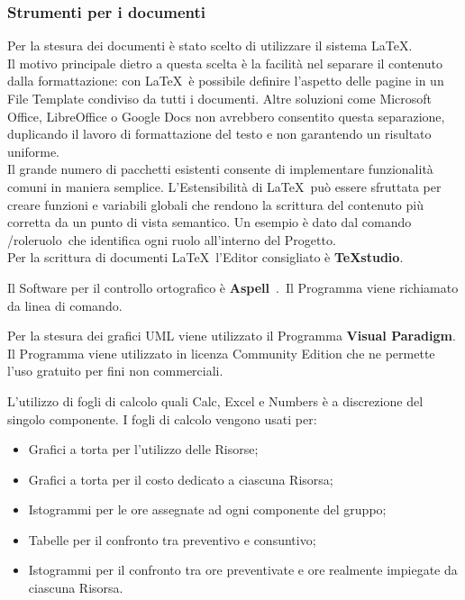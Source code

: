 {  \subsubsection{Strumenti per i documenti}
  \label{sec:strumentiDocumenti}
   
  Per la stesura dei documenti è stato scelto di utilizzare il sistema \LaTeX.\\
  Il motivo principale dietro a questa scelta è la facilità nel separare il contenuto dalla formattazione: 
  con \LaTeX\ è possibile definire l’aspetto delle pagine in un File Template condiviso da tutti i documenti. Altre soluzioni come Microsoft Office, LibreOffice o Google Docs non avrebbero consentito questa separazione, duplicando il lavoro di formattazione del testo e non garantendo un risultato uniforme.\\
  Il grande numero di pacchetti esistenti consente di implementare funzionalità comuni in maniera semplice. L’Estensibilità di \LaTeX\ può essere sfruttata per creare funzioni e variabili globali che rendono la scrittura del contenuto più corretta da un punto di vista semantico. Un esempio è dato dal comando /role\textbraceleft ruolo\textbraceright\ che identifica ogni ruolo 
  all’interno del Progetto.\\
  Per la scrittura di documenti \LaTeX\  l’Editor consigliato è \textbf{TeXstudio}. 
  
  
  
  Il Software per il controllo ortografico è \textbf{Aspell}\ .\ Il Programma viene richiamato da linea di comando.
  
  
  
  Per la stesura dei grafici UML viene utilizzato il Programma \textbf{Visual Paradigm}. Il Programma viene utilizzato in licenza Community Edition che ne permette l’uso gratuito per fini non commerciali.
  
  \label{sec:fogliDiCalcolo}
  L'utilizzo di fogli di calcolo quali Calc, Excel e Numbers è a discrezione del singolo componente.
  I fogli di calcolo vengono usati per:
  \begin{itemize}
  \item Grafici a torta per l'utilizzo delle Risorse;
  \item Grafici a torta per il costo dedicato a ciascuna Risorsa;
  \item Istogrammi per le ore assegnate ad ogni componente del gruppo;
  \item Tabelle per il confronto tra preventivo e consuntivo;
  \item Istogrammi per il confronto tra ore preventivate e ore realmente impiegate da ciascuna Risorsa.
  \end{itemize}
  

}
